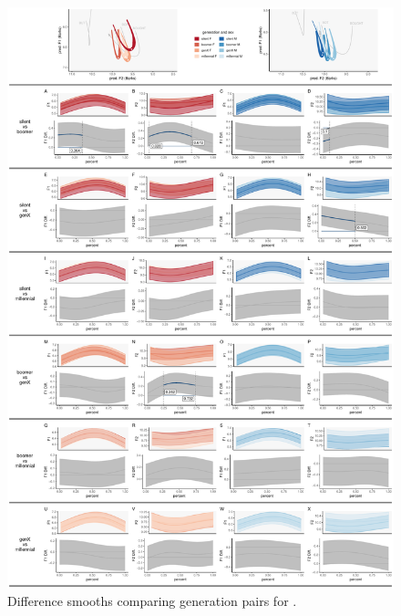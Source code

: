 \begin{figure}[p]
    \centering
    \includegraphics[width=\textwidth]{Figures/BOT/BOT_detailed_generation_panel_plot.pdf}
    \caption{Difference smooths comparing generation pairs for \lot.}
    \label{fig:bot_diff_smooths_gen}
\end{figure}


